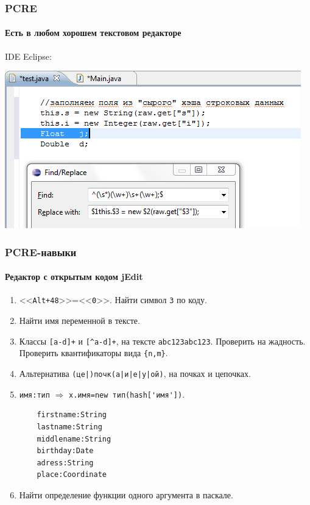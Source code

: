\begin{frame}
    \frametitle{PCRE}
    \framesubtitle{Есть в любом хорошем текстовом редакторе}

    IDE Eclipse:
    \begin{center}
        \includegraphics[width=.9\textwidth]{fig/eclipseIde}
    \end{center} 
\end{frame}


\appendix

\begin{frame}[fragile]
    \frametitle{PCRE-навыки}
    \framesubtitle{Редактор с открытым кодом jEdit}

    
    \begin{enumerate}
        \item{} <<\verb"Alt+48">>=<<\verb"0">>. Найти символ \verb"3" по коду.
        \item Найти имя переменной в тексте.
        \item Классы \verb"[a-d]+" и \verb"[^a-d]+", на тексте \verb"abc123abc123". Проверить на жадность. Проверить квантификаторы вида \verb"{n,m}".
        \item Альтернатива \verb"(це|)почк(а|и|е|у|ой)", на почках и цепочках.
        \item \verb"имя:тип" $\Rightarrow$ \verb"x.имя=new тип(hash['имя'])".
\begin{verbatim}        
    firstname:String
    lastname:String
    middlename:String
    birthday:Date
    adress:String
    place:Coordinate
\end{verbatim}        
        \item Найти определение функции одного аргумента в паскале.
    \end{enumerate} 
\end{frame}

